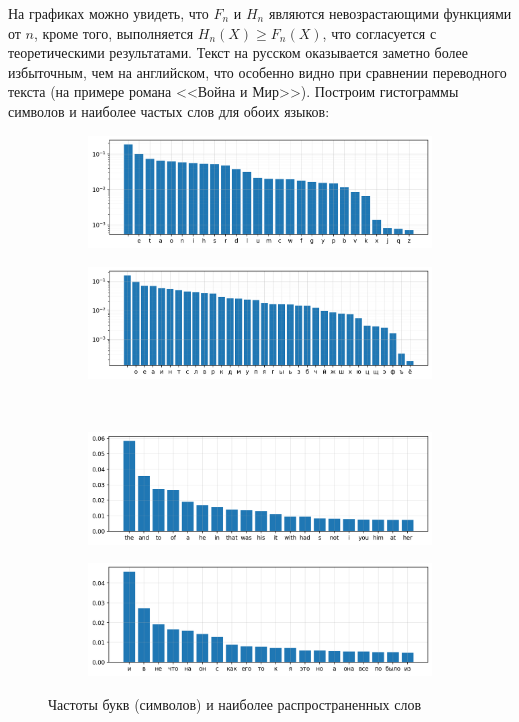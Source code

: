 \documentclass[a4paper,12pt]{article}
\begin{document}
	На графиках можно увидеть, что $F_n$ и $ H_n $ являются невозрастающими функциями от $ n $, кроме того, выполняется $H_n(X) \ge F_n(X) $, что согласуется с теоретическими результатами. Текст на русском оказывается заметно более избыточным, чем на английском, что особенно видно при сравнении переводного текста (на примере романа <<Война и Мир>>). Построим гистограммы символов и наиболее частых слов для обоих языков:
	
	\begin{figure}[h!]
		\centering
		\begin{subfigure}{0.48\linewidth}
			\includegraphics[width=\linewidth]{figs/sym_en}
		\end{subfigure}
		\begin{subfigure}{0.48\linewidth}
			\includegraphics[width=\linewidth]{figs/sym_ru}
		\end{subfigure}
		\\
		\begin{subfigure}{0.48\linewidth}
			\includegraphics[width=\linewidth]{figs/word_en}
		\end{subfigure}
		\begin{subfigure}{0.48\linewidth}
			\includegraphics[width=\linewidth]{figs/word_ru}
		\end{subfigure}
		\caption{Частоты букв (символов) и наиболее распространенных слов}
		\label{fig:sym_word}
	\end{figure}
\end{document}
